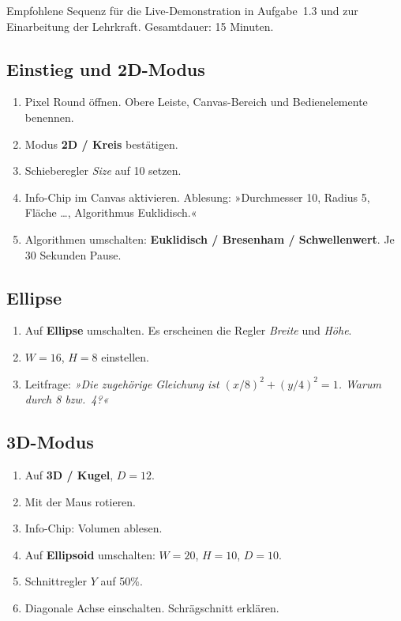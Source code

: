 \documentclass[12pt,a4paper]{scrartcl}
\newcommand{\acc}[1]{\textcolor{accent}{\textbf{#1}}}
\begin{document}
Empfohlene Sequenz für die Live-Demonstration in Aufgabe~1.3 und zur Einarbeitung der Lehrkraft. Gesamtdauer: 15 Minuten.

\subsection{Einstieg und 2D-Modus}
\begin{enumerate}[leftmargin=1.5em,itemsep=0.15em,topsep=0.3em]
  \item Pixel Round öffnen. Obere Leiste, Canvas-Bereich und Bedienelemente benennen.
  \item Modus \acc{2D / Kreis} bestätigen.
  \item Schieberegler \emph{Size} auf 10 setzen.
  \item Info-Chip im Canvas aktivieren. Ablesung: »Durchmesser 10, Radius 5, Fläche \dots, Algorithmus Euklidisch.«
  \item Algorithmen umschalten: \acc{Euklidisch / Bresenham / Schwellenwert}. Je 30 Sekunden Pause.
\end{enumerate}

\subsection{Ellipse}
\begin{enumerate}[leftmargin=1.5em,itemsep=0.15em,topsep=0.3em]
  \item Auf \acc{Ellipse} umschalten. Es erscheinen die Regler \emph{Breite} und \emph{Höhe}.
  \item $W = 16$, $H = 8$ einstellen.
  \item Leitfrage: \emph{»Die zugehörige Gleichung ist $(x/8)^2 + (y/4)^2 = 1$. Warum durch 8 bzw.\ 4?«}
\end{enumerate}

\subsection{3D-Modus}
\begin{enumerate}[leftmargin=1.5em,itemsep=0.15em,topsep=0.3em]
  \item Auf \acc{3D / Kugel}, $D = 12$.
  \item Mit der Maus rotieren.
  \item Info-Chip: Volumen ablesen.
  \item Auf \acc{Ellipsoid} umschalten: $W = 20$, $H = 10$, $D = 10$.
  \item Schnittregler $Y$ auf 50\%.
  \item Diagonale Achse einschalten. Schrägschnitt erklären.
\end{enumerate}
\end{document}
